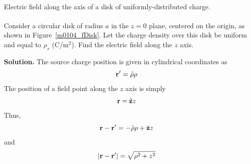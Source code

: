 ~\\ \begin{example} 
\begin{mdframed}[backgroundcolor=brown!20,linecolor=brown!20]\raggedright
Electric field along the axis of a disk of uniformly-distributed charge.
\\~\\
Consider a circular disk of radius $a$ in the $z=0$ plane, centered on the origin, as shown in Figure~\ref{m0104_fDisk}.
Let the charge density over this disk be uniform and equal to $\rho_s$ (C/m$^2$).
Find the electric field along the $z$ axis.

{\bf Solution.}
The source charge position is given in cylindrical coordinates as
%
\begin{equation}
{\bf r}' = \hat{\bf \rho}\rho  
\end{equation}
%
The position of a field point along the $z$ axis is simply
%
\begin{equation}
{\bf r} = \hat{\bf z}z  
\end{equation}
%
Thus,
%
\begin{equation}
{\bf r}-{\bf r}' = -\hat{\bf \rho}\rho + \hat{\bf z}z  
\end{equation}
%
and
%
\begin{equation}
\left|{\bf r}-{\bf r}'\right| = \sqrt{\rho^2+z^2} 
\end{equation}


\end{mdframed}
\end{example}
